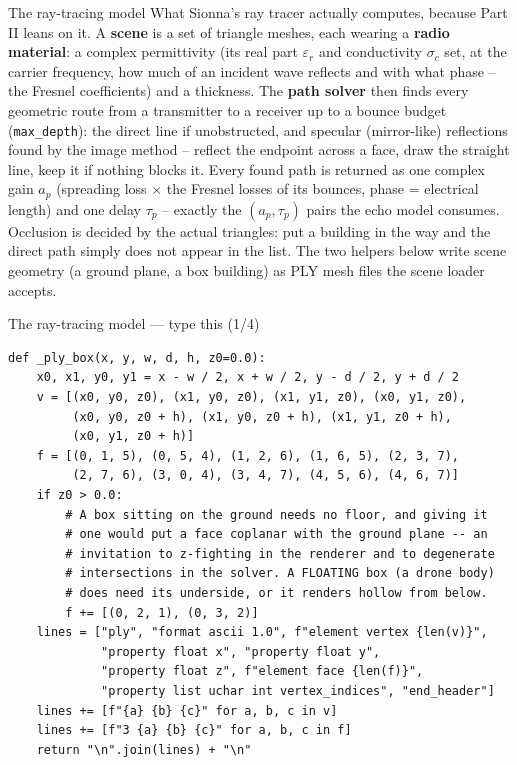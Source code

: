 \documentclass[10pt]{beamer}
\begin{document}
\begin{frame}{The ray-tracing model}
  What Sionna's ray tracer actually computes, because Part
  II leans on it. A \textbf{scene} is a set of triangle
  meshes, each wearing a \textbf{radio material}: a complex
  permittivity (its real part $\varepsilon_r$ and
  conductivity $\sigma_c$ set, at the carrier frequency,
  how much of an incident wave reflects and with what phase
  -- the Fresnel coefficients) and a thickness. The
  \textbf{path solver} then finds every geometric route
  from a transmitter to a receiver up to a bounce budget
  (\texttt{max\_depth}): the direct line if unobstructed,
  and specular (mirror-like) reflections found by the
  image method -- reflect the endpoint across a face,
  draw the straight line, keep it if nothing blocks it.
  Every found path is returned as one complex gain $a_p$
  (spreading loss $\times$ the Fresnel losses of its
  bounces, phase = electrical length) and one delay
  $\tau_p$ -- exactly the $(a_p, \tau_p)$ pairs the echo
  model consumes. Occlusion is decided by the actual
  triangles: put a building in the way and the direct path
  simply does not appear in the list. The two helpers
  below write scene geometry (a ground plane, a box
  building) as PLY mesh files the scene loader accepts.
\end{frame}

\begin{frame}[fragile]{The ray-tracing model --- type this (1/4)}
\begin{lstlisting}[basicstyle=\ttfamily\tiny]
def _ply_box(x, y, w, d, h, z0=0.0):
    x0, x1, y0, y1 = x - w / 2, x + w / 2, y - d / 2, y + d / 2
    v = [(x0, y0, z0), (x1, y0, z0), (x1, y1, z0), (x0, y1, z0),
         (x0, y0, z0 + h), (x1, y0, z0 + h), (x1, y1, z0 + h),
         (x0, y1, z0 + h)]
    f = [(0, 1, 5), (0, 5, 4), (1, 2, 6), (1, 6, 5), (2, 3, 7),
         (2, 7, 6), (3, 0, 4), (3, 4, 7), (4, 5, 6), (4, 6, 7)]
    if z0 > 0.0:
        # A box sitting on the ground needs no floor, and giving it
        # one would put a face coplanar with the ground plane -- an
        # invitation to z-fighting in the renderer and to degenerate
        # intersections in the solver. A FLOATING box (a drone body)
        # does need its underside, or it renders hollow from below.
        f += [(0, 2, 1), (0, 3, 2)]
    lines = ["ply", "format ascii 1.0", f"element vertex {len(v)}",
             "property float x", "property float y",
             "property float z", f"element face {len(f)}",
             "property list uchar int vertex_indices", "end_header"]
    lines += [f"{a} {b} {c}" for a, b, c in v]
    lines += [f"3 {a} {b} {c}" for a, b, c in f]
    return "\n".join(lines) + "\n"

\end{lstlisting}
\end{frame}
\end{document}
